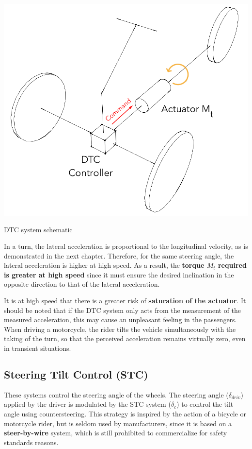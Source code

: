 \begin{marginfigure}
	\includegraphics[width=1.0\linewidth]{figs/02/dtc_diagram}
	\caption{DTC system schematic}
\end{marginfigure}

In a turn, the lateral acceleration is proportional to the longitudinal velocity, as is demonstrated in the next chapter. Therefore, for the same steering angle, the lateral acceleration is higher at high speed. As a result, the \textbf{torque $M_t$ required is greater at high speed} since it must ensure the desired inclination in the opposite direction to that of the lateral acceleration. 

It is at high speed that there is a greater risk of \textbf{saturation of the actuator}. It should be noted that if the DTC system only acts from the measurement of the measured acceleration, this may cause an unpleasant feeling in the passengers. When driving a motorcycle, the rider tilts the vehicle simultaneously with the taking of the turn, so that the perceived acceleration remains virtually zero, even in transient situations.

\subsection{Steering Tilt Control (STC)}

These systems control the steering angle of the wheels. The steering angle ($\delta_{driv}$) applied by the driver is modulated by the STC system ($\delta_c$) to control the tilt angle using countersteering. This strategy is inspired by the action of a bicycle or motorcycle rider, but is seldom used by manufacturers, since it is based on a \textbf{steer-by-wire} system, which is still prohibited to commercialize for safety standards reasons.

